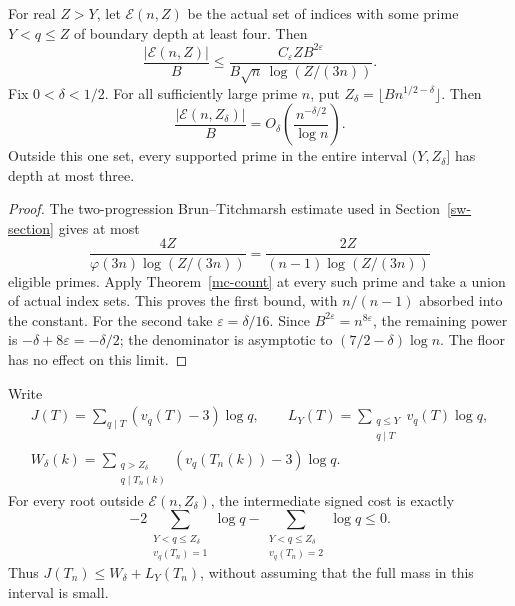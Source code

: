 \begin{theorem}
\label{mc-window}
For real \(Z>Y\), let \(\mathcal{E}(n,Z)\) be the actual set of indices
with some prime \(Y<q\leq Z\) of boundary depth at least four. Then
\[
 \frac{|\mathcal{E}(n,Z)|}{B}
 \leq
 \frac{C_\varepsilon ZB^{2\varepsilon}}
      {B\sqrt n\,\log(Z/(3n))}.
\]
Fix \(0<\delta<1/2\). For all sufficiently large prime \(n\), put
\(Z_\delta=\lfloor Bn^{1/2-\delta}\rfloor\). Then
\begin{equation}\label{mc-exception}
 \frac{|\mathcal{E}(n,Z_\delta)|}{B}
       =O_\delta\!\left(\frac{n^{-\delta/2}}{\log n}\right).
\end{equation}
Outside this one set, every supported prime in the entire interval
\((Y,Z_\delta]\) has depth at most three.
\end{theorem}
\begin{proof}
The two-progression Brun--Titchmarsh estimate used in
Section~\ref{sw-section} gives at most
\[
 \frac{4Z}{\varphi(3n)\log(Z/(3n))}
 =\frac{2Z}{(n-1)\log(Z/(3n))}
\]
eligible primes. Apply Theorem~\ref{mc-count} at every such prime
and take a union of actual index sets. This proves the first bound,
with \(n/(n-1)\) absorbed into the constant.
For the second take \(\varepsilon=\delta/16\).
Since \(B^{2\varepsilon}=n^{8\varepsilon}\), the remaining power is
\(-\delta+8\varepsilon=-\delta/2\); the denominator is asymptotic
to \((7/2-\delta)\log n\). The floor has no effect on this limit.
\end{proof}

Write
\begin{gather*}
 J(T)=\sum_{q\mid T}(v_q(T)-3)\log q,\qquad
 L_Y(T)=\sum_{\substack{q\leq Y\\q\mid T}}v_q(T)\log q,\\
 W_\delta(k)=\sum_{\substack{q>Z_\delta\\q\mid T_n(k)}}
                  (v_q(T_n(k))-3)\log q .
\end{gather*}
For every root outside \(\mathcal{E}(n,Z_\delta)\), the intermediate
signed cost is exactly
\[
 -2\!\sum_{\substack{Y<q\leq Z_\delta\\v_q(T_n)=1}}\log q
 -\!\sum_{\substack{Y<q\leq Z_\delta\\v_q(T_n)=2}}\log q\leq0.
\]
Thus \(J(T_n)\leq W_\delta+L_Y(T_n)\), without assuming that the
full mass in this interval is small.

